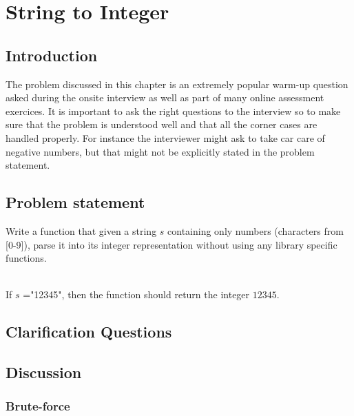 %

\chapter{String to Integer}
\label{ch:string_to_int}
\section*{Introduction}
The problem discussed in this chapter is an extremely popular warm-up question asked during the onsite interview as well as part of many online assessment exercices. It is important to ask the right questions to the interview so to make sure that the problem is understood well and that all the corner cases are handled properly. For instance the interviewer might ask  to take car care of negative numbers, but that might not be explicitly stated in the problem statement.

\section{Problem statement}
\begin{exercise}
Write a function that given a string $s$ containing only numbers (characters from [0-9]), parse it into its integer representation without using any library specific functions.
\end{exercise}


\begin{example}
	\hfill \\
	If $s$ ="12345", then the function should return the integer $12345$.	
\end{example}


\section{Clarification Questions}

\begin{QandA}
	\item 
	\begin{answered}
		\textit{}
	\end{answered}
	
\end{QandA}

\section{Discussion}
\label{string_to_int:sec:discussion}


\subsection{Brute-force}
\label{string_to_int:sec:bruteforce}




